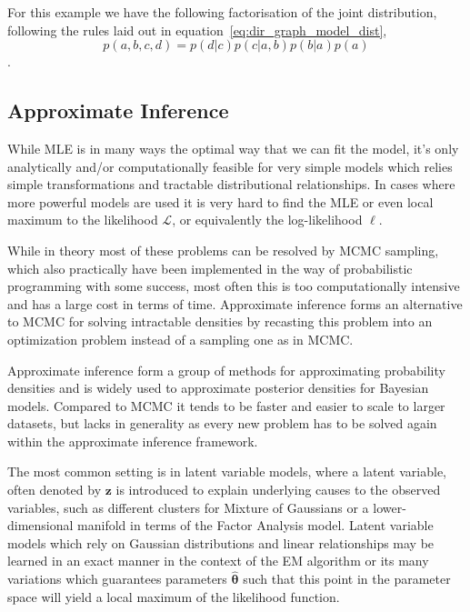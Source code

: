 For this example we have the following factorisation of the joint distribution,
following the rules laid out in equation~\ref{eq:dir_graph_model_dist},
\begin{equation*}
  p(a, b, c, d) = p(d | c)p(c | a, b)p(b | a)p(a)
\end{equation*}.

\subsection{Approximate Inference}

While MLE is in many ways the optimal way that we can fit the model, it's only
analytically and/or computationally feasible for very simple models which relies
simple transformations and tractable distributional relationships. In cases
where more powerful models are used it is very hard to find the MLE or even
local maximum to the likelihood $\mathcal{L}$, or equivalently the log-likelihood
$\ell$.

While in theory most of these problems can be resolved by MCMC
sampling, which also practically have been implemented in the way of
probabilistic programming with some
success\cite[Ch.~1]{brooks2011handbook}\cite{Carpenter_stan:a,
  journals/peerj-cs/SalvatierWF16}, most often this is too computationally
intensive and has a large cost in terms of time. Approximate inference forms an
alternative to MCMC for solving intractable densities by recasting this problem
into an optimization problem instead of a sampling one as in MCMC.

Approximate inference form a group of methods for approximating probability
densities and is widely used to approximate posterior densities for Bayesian
models. Compared to MCMC it tends to be faster and easier to scale to larger
datasets, but lacks in generality as every new problem has to be solved again
within the approximate inference framework.

The most common setting is in latent variable models, where a latent
variable, often denoted by $\bm{z}$ is introduced to explain underlying causes
to the observed variables, such as different clusters for Mixture of
Gaussians or a lower-dimensional manifold in
terms of the Factor Analysis model\cite[page.~430-439, 583-586]{Bishop:2006}.
Latent variable models which rely on Gaussian distributions and linear
relationships may be learned in an exact manner in the context of the EM
algorithm or its many variations which guarantees parameters $\hat{\bm{\theta}}$
such that this point in the parameter space will yield a local maximum of the
likelihood function\cite{Dempster77maximumlikelihood, Neal98aview}.

